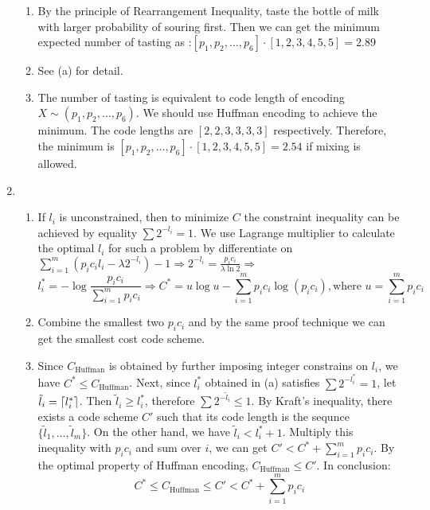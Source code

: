 \documentclass{article}
\DeclarePairedDelimiter\ceil{\lceil}{\rceil}
\begin{document}
\begin{enumerate}
\begin{enumerate}[label=(\alph*)]
\item By the principle of Rearrangement Inequality, taste the bottle of milk with larger probability of souring first. Then we can get the minimum expected
number of tasting as :$[p_1,p_2,\dots,p_6]\cdot[1,2,3,4,5,5]=2.89$
\item See (a) for detail.
\item The number of tasting is equivalent to code length of encoding $X\sim (p_1,p_2,\dots,p_6)$. We should use Huffman encoding to achieve the minimum.
The code lengths are $[2,2,3,3,3,3]$ respectively. Therefore, the minimum is $[p_1,p_2,\dots,p_6]\cdot[1,2,3,4,5,5]=2.54$ if mixing is allowed.
\end{enumerate}
\item
\begin{enumerate}[label=(\alph*)] 
\item If $l_i$ is unconstrained, then to minimize $C$ the constraint inequality can be achieved by equality $\sum 2^{-l_i}=1$. We use Lagrange multiplier to 
calculate the optimal $l_i$ for such a problem by differentiate on $\sum_{i=1}^m (p_i c_i l_i -\lambda 2^{-l_i})-1 \Rightarrow 2^{-l_i} = \frac{p_i c_i}{\lambda\ln 2 } \Rightarrow $
$$
l^*_i = -\log \frac{p_i c_i}{\sum_{i=1}^m p_i c_i} \Rightarrow C^* = u\log u - \sum_{i=1}^m p_i c_i \log (p_i c_i),\text{where } u=\sum_{i=1}^m p_i c_i
$$
\item Combine the smallest two $p_i c_i$ and by the same proof technique we can get the smallest cost code scheme.
\item Since $C_{\textrm{Huffman}}$ is obtained by further imposing integer constrains on $l_i$, we have $C^* \leq C_{\textrm{Huffman}}$.
Next, since $l_i^*$ obtained in (a) satisfies $\sum 2^{-l^*_i} = 1$, let $\tilde{l}_i=\ceil{l^*_i}$. Then $\tilde{l}_i\geq l^*_i$, therefore
$\sum 2^{-\tilde{l}_i} \leq 1 $. By Kraft's inequality, there exists a code scheme $C'$ such that its code length is the sequnce $\{\tilde{l}_1,\dots,\tilde{l}_m\}$. On the other hand, we have $\tilde{l}_i < l^*_i+1$. Multiply this inequality with $p_ic_i$ and sum over $i$, we can get
$C' < C^* + \sum_{i=1}^m p_i c_i$. By the optimal property of Huffman encoding, $C_{\textrm{Huffman}}\leq C'$. In conclusion:
$$
C^* \leq C_{\textrm{Huffman}} \leq C' < C^* + \sum_{i=1}^m p_i c_i
$$ 
\end{enumerate}

\end{enumerate}
\end{document}
